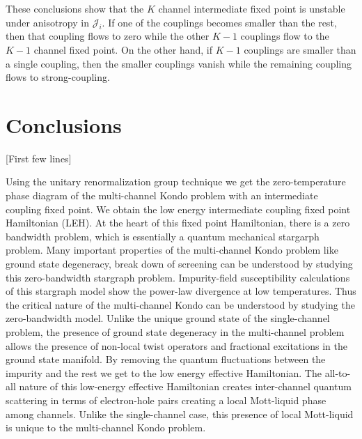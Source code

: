 \documentclass[reprint,prb,superscriptaddress]{revtex4-1}
\begin{document}
These conclusions show that the \(K\) channel intermediate fixed point is unstable under anisotropy in \(\mathcal{J}_i\). If one of the couplings becomes smaller than the rest, then that coupling flows to zero while the other \(K-1\) couplings flow to the \(K-1\) channel fixed point. On the other hand, if \(K-1\) couplings are smaller than a single coupling, then the smaller couplings vanish while the remaining coupling flows to strong-coupling.


\section{Conclusions}
[First few lines] 
\par Using the unitary renormalization group technique we get the zero-temperature phase diagram of the multi-channel Kondo problem with an intermediate coupling fixed point. We obtain the low energy intermediate coupling fixed point Hamiltonian (LEH).  At the heart of this fixed point Hamiltonian, there is a zero bandwidth problem, which is essentially a quantum mechanical stargarph problem. Many important properties of the multi-channel Kondo problem like ground state degeneracy, break down of screening can be understood by studying this zero-bandwidth stargraph problem. Impurity-field susceptibility calculations of this stargraph model show the power-law divergence at low temperatures. Thus the critical nature of the multi-channel Kondo can be understood by studying the zero-bandwidth model. Unlike the unique ground state of the single-channel problem, the presence of ground state degeneracy in the multi-channel problem allows the presence of non-local twist operators and fractional excitations in the ground state manifold. By removing the quantum fluctuations between the impurity and the rest we get to the low energy effective Hamiltonian. The all-to-all nature of this low-energy effective Hamiltonian creates inter-channel quantum scattering in terms of electron-hole pairs creating a local Mott-liquid phase among channels. Unlike the single-channel case, this presence of local Mott-liquid is unique to the multi-channel Kondo problem.
\end{document}
